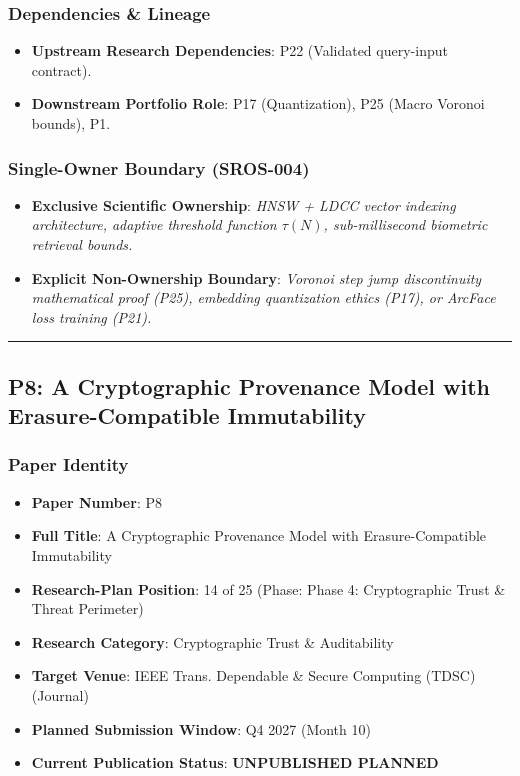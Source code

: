 \documentclass[11pt,letterpaper]{article}
\begin{document}
\subsubsection{Dependencies \& Lineage}
\begin{itemize}[leftmargin=*]
    \item \textbf{Upstream Research Dependencies}: P22 (Validated query-\allowbreak input contract).
    \item \textbf{Downstream Portfolio Role}: P17 (Quantization), P25 (Macro Voronoi bounds), P1.
\end{itemize}

\subsubsection{Single-Owner Boundary (SROS-004)}
\begin{itemize}[leftmargin=*]
    \item \textbf{Exclusive Scientific Ownership}: \textit{HNSW + LDCC vector indexing architecture, adaptive threshold function $\tau(N)$, sub-\allowbreak millisecond biometric retrieval bounds.}
    \item \textbf{Explicit Non-Ownership Boundary}: \textit{Voronoi step jump discontinuity mathematical proof (P25), embedding quantization ethics (P17), or ArcFace loss training (P21).}
\end{itemize}

\vspace{0.4cm}
\hrule

\subsection{P8: A Cryptographic Provenance Model with Erasure-\allowbreak Compatible Immutability}
\label{sec:profile_p8}

\subsubsection{Paper Identity}
\begin{itemize}[leftmargin=*]
    \item \textbf{Paper Number}: P8
    \item \textbf{Full Title}: A Cryptographic Provenance Model with Erasure-\allowbreak Compatible Immutability
    \item \textbf{Research-Plan Position}: 14 of 25 (Phase: Phase 4: Cryptographic Trust \& Threat Perimeter)
    \item \textbf{Research Category}: Cryptographic Trust \& Auditability
    \item \textbf{Target Venue}: IEEE Trans. Dependable \& Secure Computing (TDSC) (Journal)
    \item \textbf{Planned Submission Window}: Q4 2027 (Month 10)
    \item \textbf{Current Publication Status}: \textbf{UNPUBLISHED PLANNED}
\end{itemize}
\end{document}
